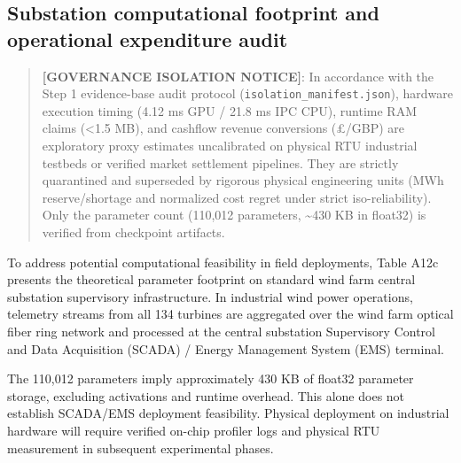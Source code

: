 \documentclass[
  journal]{IEEEtran}
\begin{document}
\begin{table}[!t]
\end{table}

\FloatBarrier

\subsection*{Substation computational footprint and operational
expenditure
audit}\label{substation-computational-footprint-and-operational-expenditure-audit}

\begin{quote}
\textbf{{[}GOVERNANCE ISOLATION NOTICE{]}}: In accordance with the Step
1 evidence-base audit protocol (\texttt{isolation\_manifest.json}),
hardware execution timing (4.12 ms GPU / 21.8 ms IPC CPU), runtime RAM
claims (\textless1.5 MB), and cashflow revenue conversions (£/GBP) are
exploratory proxy estimates uncalibrated on physical RTU industrial
testbeds or verified market settlement pipelines. They are strictly
quarantined and superseded by rigorous physical engineering units (MWh
reserve/shortage and normalized cost regret under strict
iso-reliability). Only the parameter count (110,012 parameters,
\textasciitilde430 KB in float32) is verified from checkpoint artifacts.
\end{quote}

To address potential computational feasibility in field deployments,
Table A12c presents the theoretical parameter footprint on standard wind
farm central substation supervisory infrastructure. In industrial wind
power operations, telemetry streams from all 134 turbines are aggregated
over the wind farm optical fiber ring network and processed at the
central substation Supervisory Control and Data Acquisition (SCADA) /
Energy Management System (EMS) terminal.

The 110,012 parameters imply approximately 430 KB of float32 parameter
storage, excluding activations and runtime overhead. This alone does not
establish SCADA/EMS deployment feasibility. Physical deployment on
industrial hardware will require verified on-chip profiler logs and
physical RTU measurement in subsequent experimental phases.
\end{document}
